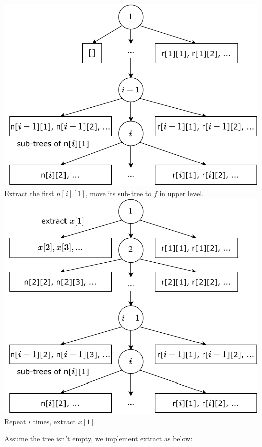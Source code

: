 \documentclass[b5paper]{article}
\begin{document}
\begin{Answer}
{\begin{center}
  \includegraphics[scale=0.4]{img/ftr-illed-2} \\
  Extract the first $n[i][1]$, move its sub-tree to $f$ in upper level.\\
  \includegraphics[scale=0.4]{img/ftr-illed-i} \\
  Repeat $i$ times, extract $x[1]$. \\
  \label{fig:ftr-illed-extract}
\end{center}

Assume the tree isn't empty, we implement extract as below:

}
\end{Answer}
\end{document}
